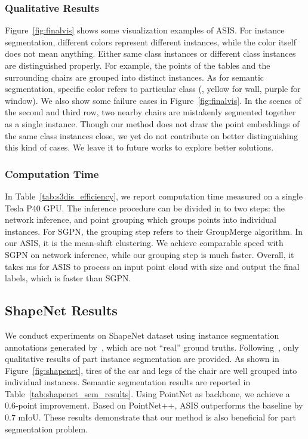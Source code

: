 \documentclass[10pt,twocolumn,letterpaper]{article}
\begin{document}
\vspace{-0.2cm}
\subsubsection{Qualitative Results}
Figure~\ref{fig:finalvis} shows some visualization examples of ASIS.
For instance segmentation, different colors represent different instances, while the color itself does not mean anything.
Either same class instances or different class instances are distinguished properly.
For example, the points of the tables and the surrounding chairs are grouped into distinct instances. 
As for semantic segmentation, specific color refers to particular class (\eg, yellow for wall, purple for window).
We also show some failure cases in Figure~\ref{fig:finalvis}.
In the scenes of the second and third row, two nearby chairs are mistakenly segmented together as a single instance.
Though our method does not draw the point embeddings of the same class instances close, we yet do not contribute on better distinguishing this kind of cases.  
We leave it to future works to explore better solutions.


\vspace{-0.2cm}
\subsubsection{Computation Time}
In Table~\ref{tab:s3dis_efficiency}, we report computation time  measured on a single Tesla P40 GPU. 
The inference procedure can be divided in to two steps: the network inference, and point grouping which groups points into individual instances.
For SGPN, the grouping step refers to their GroupMerge algorithm. 
In our ASIS, it is the mean-shift clustering.
We achieve comparable speed with SGPN on network inference, while our grouping step is much faster.
Overall, it takes ms for ASIS to process an input point cloud with size  and output the final labels, which is  faster than SGPN.







\subsection{ShapeNet Results}
We conduct experiments on ShapeNet dataset using instance segmentation annotations generated by~\cite{sgpn}, which are not ``real'' ground truths. 
Following~\cite{sgpn}, only qualitative results of part instance segmentation are provided.
As shown in Figure~\ref{fig:shapenet}, tires of the car and legs of the chair are well grouped into individual instances.
Semantic segmentation results are reported in Table~\ref{tab:shapenet_sem_results}.
Using PointNet as backbone, we achieve a 0.6-point improvement.
Based on PointNet++, ASIS outperforms the baseline by 0.7 mIoU. 
These results demonstrate that our method is also beneficial for part segmentation problem.
\end{document}
